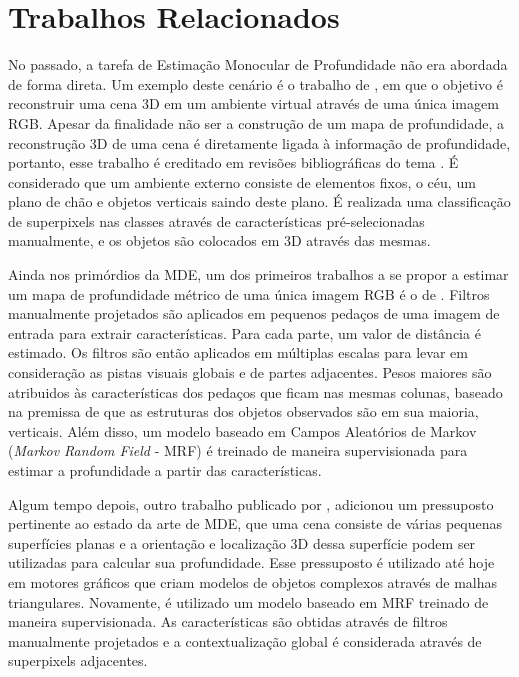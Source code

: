\chapter{Trabalhos Relacionados}


No passado, a tarefa de Estimação Monocular de Profundidade não era abordada de forma direta. Um exemplo deste cenário é o trabalho de , em que o objetivo é reconstruir uma cena 3D em um ambiente virtual através de uma única imagem RGB. Apesar da finalidade não ser a construção de um mapa de profundidade, a reconstrução 3D de uma cena é diretamente ligada à informação de profundidade, portanto, esse trabalho é creditado em revisões bibliográficas do tema \cite{mertan2022single}. É considerado que um ambiente externo consiste de elementos fixos, o céu, um plano de chão e objetos verticais saindo deste plano. É realizada uma classificação de superpixels nas classes através de características pré-selecionadas manualmente, e os objetos são colocados em 3D através das mesmas.


Ainda nos primórdios da MDE, um dos primeiros trabalhos a se propor a estimar um mapa de profundidade métrico de uma única imagem RGB é o de . Filtros manualmente projetados são aplicados em pequenos pedaços de uma imagem de entrada para extrair características. Para cada parte, um valor de distância é estimado. Os filtros são então aplicados em múltiplas escalas para levar em consideração as pistas visuais globais e de partes adjacentes. Pesos maiores são atribuidos às características dos pedaços que ficam nas mesmas colunas, baseado na premissa de que as estruturas dos objetos observados são em sua maioria, verticais. Além disso, um modelo baseado em Campos Aleatórios de Markov (\textit{Markov Random Field} - MRF) é treinado de maneira supervisionada para estimar a profundidade a partir das características.


Algum tempo depois, outro trabalho publicado por , adicionou um pressuposto pertinente ao estado da arte de MDE, que uma cena consiste de várias pequenas superfícies planas e a orientação e localização 3D dessa superfície podem ser utilizadas para calcular sua profundidade. Esse pressuposto é utilizado até hoje em motores gráficos que criam modelos de objetos complexos através de malhas triangulares. Novamente, é utilizado um modelo baseado em MRF treinado de maneira supervisionada. As características são obtidas através de filtros manualmente projetados e a contextualização global é considerada através de superpixels adjacentes.


